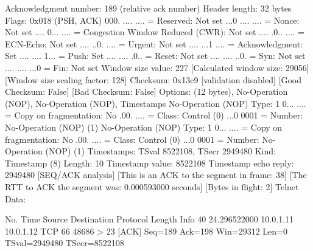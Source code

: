     Acknowledgment number: 189    (relative ack number)
    Header length: 32 bytes
    Flags: 0x018 (PSH, ACK)
        000. .... .... = Reserved: Not set
        ...0 .... .... = Nonce: Not set
        .... 0... .... = Congestion Window Reduced (CWR): Not set
        .... .0.. .... = ECN-Echo: Not set
        .... ..0. .... = Urgent: Not set
        .... ...1 .... = Acknowledgment: Set
        .... .... 1... = Push: Set
        .... .... .0.. = Reset: Not set
        .... .... ..0. = Syn: Not set
        .... .... ...0 = Fin: Not set
    Window size value: 227
    [Calculated window size: 29056]
    [Window size scaling factor: 128]
    Checksum: 0x13c9 [validation disabled]
        [Good Checksum: False]
        [Bad Checksum: False]
    Options: (12 bytes), No-Operation (NOP), No-Operation (NOP), Timestamps
        No-Operation (NOP)
            Type: 1
                0... .... = Copy on fragmentation: No
                .00. .... = Class: Control (0)
                ...0 0001 = Number: No-Operation (NOP) (1)
        No-Operation (NOP)
            Type: 1
                0... .... = Copy on fragmentation: No
                .00. .... = Class: Control (0)
                ...0 0001 = Number: No-Operation (NOP) (1)
        Timestamps: TSval 8522108, TSecr 2949480
            Kind: Timestamp (8)
            Length: 10
            Timestamp value: 8522108
            Timestamp echo reply: 2949480
    [SEQ/ACK analysis]
        [This is an ACK to the segment in frame: 38]
        [The RTT to ACK the segment was: 0.000593000 seconds]
        [Bytes in flight: 2]
Telnet
    Data: 

No.     Time           Source                Destination           Protocol Length Info
     40 24.296522000   10.0.1.11             10.0.1.12             TCP      66     48686 > 23 [ACK] Seq=189 Ack=198 Win=29312 Len=0 TSval=2949480 TSecr=8522108

